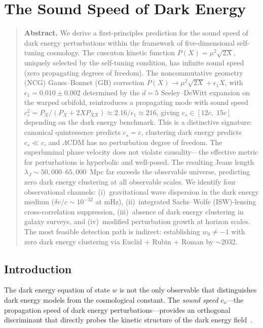 \chapter{The Sound Speed of Dark Energy}
\label{ch:sound-speed}

\begin{quote}
\textbf{Abstract.}
We derive a first-principles prediction for the sound speed of dark energy perturbations within the framework of five-dimensional self-tuning cosmology. The cuscuton kinetic function $P(X) = \mu^2 \sqrt{2X}$, uniquely selected by the self-tuning condition, has infinite sound speed (zero propagating degrees of freedom). The noncommutative geometry (NCG) Gauss--Bonnet (GB) correction $P(X) \to \mu^2 \sqrt{2X} + \epsilon_1 X$, with $\epsilon_1 = 0.010 \pm 0.002$ determined by the $d = 5$ Seeley--DeWitt expansion on the warped orbifold, reintroduces a propagating mode with sound speed $c_s^2 = P_X / (P_X + 2X P_{XX}) \approx 2.16/\epsilon_1 \approx 216$, giving $c_s \in [12c,\; 15c]$ depending on the dark energy benchmark. This is a distinctive signature: canonical quintessence predicts $c_s = c$, clustering dark energy predicts $c_s \ll c$, and $\Lambda$CDM has no perturbation degree of freedom. The superluminal phase velocity does not violate causality---the effective metric for perturbations is hyperbolic and well-posed. The resulting Jeans length $\lambda_J \sim 50{,}000$--$65{,}000$~Mpc far exceeds the observable universe, predicting zero dark energy clustering at all observable scales. We identify four observational channels: (i)~gravitational wave dispersion in the dark energy medium ($\delta v/c \sim 10^{-32}$ at mHz), (ii)~integrated Sachs--Wolfe (ISW)-lensing cross-correlation suppression, (iii)~absence of dark energy clustering in galaxy surveys, and (iv)~modified perturbation growth at horizon scales. The most feasible detection path is indirect: establishing $w_0 \neq -1$ with zero dark energy clustering via Euclid + Rubin + Roman by ${\sim}2032$.
\end{quote}

\section{Introduction}
\label{sec:5-introduction}

The dark energy equation of state $w$ is not the only observable that distinguishes dark energy models from the cosmological constant. The \emph{sound speed} $c_s$---the propagation speed of dark energy perturbations---provides an orthogonal discriminant that directly probes the kinetic structure of the dark energy field~\cite{ch5:BeanDore2004,ch5:Hu2005}.

